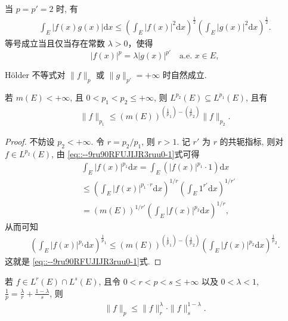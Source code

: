 \documentclass[../../main.tex]{subfiles}%
\begin{document}
\begin{theorem}\label{theorem:Hölder不等式特例:Schwarz不等式}
当 $p=p'=2$ 时, 有
\begin{align*}
\int_E |f(x)g(x)|\mathrm{d}x \leqslant \left( \int_E |f(x)|^2 \mathrm{d}x \right)^{\frac{1}{2}} \left( \int_E |g(x)|^2 \mathrm{d}x \right)^{\frac{1}{2}}.
\end{align*}
等号成立当且仅当存在常数 $\lambda>0$，使得
\[
|f(x)|^p = \lambda |g(x)|^{p'} \quad \text{a.e. } x\in E,
\]
\end{theorem}
\begin{remark}
Hölder 不等式对 $\|f\|_p$ 或 $\|g\|_{p'}=+\infty$ 时自然成立.
\end{remark}

\begin{example}
若 $m(E)<+\infty$, 且 $0<p_1<p_2\leqslant+\infty$, 则 $L^{p_2}(E)\subseteq L^{p_1}(E)$, 且有
\begin{align}
\|f\|_{p_1} \leqslant (m(E))^{(\frac{1}{p}_1)-(\frac{1}{p}_2)} \|f\|_{p_2}.
\end{align}
\end{example}

\begin{proof}
不妨设 $p_2<+\infty$. 令 $r=p_2/p_1$, 则 $r>1$. 记 $r'$ 为 $r$ 的共轭指标, 则对 $f\in L^{p_2}(E)$, 由 \eqref{eq::--9ru90RFUJIJR3ruu0-1}式可得
\begin{align*}
&\int_E |f(x)|^{p_1} \mathrm{d}x = \int_E (|f(x)|^{p_1} \cdot 1) \mathrm{d}x \\
&\leqslant \left( \int_E |f(x)|^{p_1 \cdot r} \mathrm{d}x \right)^{1/r} \left( \int_E 1^{r'} \mathrm{d}x \right)^{1/r'} \\
&= (m(E))^{1/r'} \left( \int_E |f(x)|^{p_2} \mathrm{d}x \right)^{1/r},
\end{align*}
从而可知
\begin{align*}
\left( \int_E |f(x)|^{p_1} \mathrm{d}x \right)^{\frac{1}{p}_1} \leqslant (m(E))^{(\frac{1}{p}_1)-(\frac{1}{p}_2)} \left( \int_E |f(x)|^{p_2} \mathrm{d}x \right)^{\frac{1}{p}_2}.
\end{align*}
这就是 \eqref{eq::--9ru90RFUJIJR3ruu0-1}式.
\end{proof}

\begin{example}
若 $f\in L^r(E)\cap L^s(E)$, 且令 $0<r<p<s\leqslant+\infty$ 以及 $0<\lambda<1$, $\frac{1}{p}=\frac{\lambda}{r}+\frac{1-\lambda}{s}$, 则
\begin{align*}
\|f\|_p \leqslant \|f\|_r^\lambda \cdot \|f\|_s^{1-\lambda}.
\end{align*}
\end{example}
\end{document}
